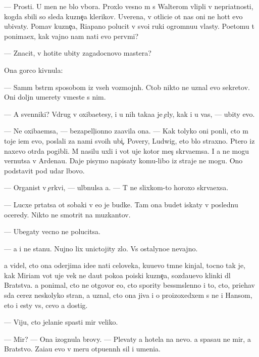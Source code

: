 \documentclass[10pt]{book}
\begin{document}
— Prosti. U men{\ia} ne b{\yi}lo v{\yi}bora. Proxlo{\y} vesno{\y} m{\yi} s Walterom vlipli v nepri\-{\y}at\-nosti, kogda sbili so sleda kuzne{\c}a klerikov. Uve\-re\-na, v otlici{\y}e ot nas oni ne hot{\ia}t {\y}evo ubivaty. Po{\y}mav kuzne{\c}a, Riapano polucit v svo{\y}i ruki ogromnu{\y}u vlas\-ty. Poetomu t{\yi} ponima{\y}ex, kak vajno nam na{\y}ti {\y}evo perv{\yi}mi?

— Znacit, v{\yi} hotite ubity zagadocnovo mastera?

Ona gor{\ia}co kivnula:

— Sam{\yi}m b{\yi}str{\yi}m sposobom iz vseh vozmojn{\yi}h. Ctob{\yi} nikto ne uznal {\y}evo sekretov. Oni doljn{\yi} umerety vmeste s nim.

— A sv{\ia}{\x}enniki? Vdrug v{\yi} oxiba{\y}etesy, i u nih taka{\y}a je {\c}ely, kak i u vas, — ubity {\y}evo.

— Ne oxiba{\y}emsa, — bezapell{\ia}{\c}ionno za{\y}avila ona. — Kak tolyko oni pon{\ia}li, cto m{\yi} toje i{\x}em {\y}evo, poslali za nami svo{\y}ih ubi{\y}{\c}. Povery, Ludwig, eto b{\yi}lo straxno. P{\ia}tero iz naxevo otr{\ia}da pogibli. M{\yi} nasilu uxli i vot uje kotor{\yi}{\y} mes{\ia}{\c} skr{\yi}va{\y}emsa. I {\y}a ne mogu vernutsa v Ardenau. Daje pisymo napisaty komu-libo iz straje{\y} ne mogu. Ono podstavit pod udar l{\io}bovo.

— Organist v {\c}erkvi, — ul{\yi}bnulsa {\y}a. — T{\yi} ne slixkom-to horoxo skr{\yi}va{\y}exsa.

— Lucxe pr{\ia}tatsa ot sobaki v {\y}e{\y}o je budke. Tam ona budet iskaty v posledn{\io}{\y}u oceredy. Nikto ne smotrit na muz{\yi}kantov.

— Ubegaty vecno ne polucitsa.

— {\Y}a i ne stanu. Nujno lix unictojity zlo. Vs{\e} ostalyno{\y}e ne\-vaj\-no.

{\Y}a videl, cto ona oderjima ide{\y}e{\y} na{\y}ti celoveka, ku{\y}u{\x}evo t{\e}mn{\yi}{\y}e kinjal{\yi}, tocno tak je, kak Mi\-ri\-am vot uje vek ne da{\y}ut poko{\y}a poiski kuzne{\c}a, sozda{\y}u{\x}evo klinki dl{\ia} Bratstva. {\Y}a ponimal, cto ne otgovor{\io} {\y}e{\y}o, cto spority bessm{\yi}slenno i to, cto, pri{\y}ehav s{\io}da cerez neskolyko stran, {\y}a uznal, cto ona jiva i o proizoxedxem s ne{\y} i Hansom, eto i {\y}esty vs{\e}, cevo {\y}a dostig.

— Viju, cto jelani{\y}e spasti mir veliko.

— Mir? — Ona izognula brovy. — Plevaty {\y}a hotela na nevo. {\Y}a spasa{\y}u ne mir, a Bratstvo. Za{\x}i{\x}a{\y}u {\y}evo v meru otpu{\x}enn{\yi}h sil i umeni{\y}a.
\end{document}
